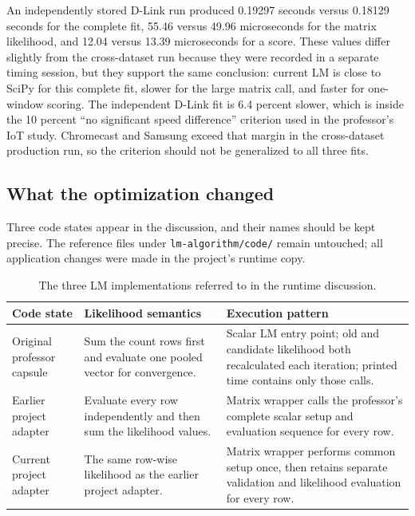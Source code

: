 \documentclass[11pt]{article}
\begin{document}
An independently stored D-Link run produced 0.19297 seconds versus 0.18129
seconds for the complete fit, 55.46 versus 49.96 microseconds for the matrix
likelihood, and 12.04 versus 13.39 microseconds for a score. These values differ
slightly from the cross-dataset run because they were recorded in a separate
timing session, but they support the same conclusion: current LM is close to
SciPy for this complete fit, slower for the large matrix call, and faster for
one-window scoring. The independent D-Link fit is 6.4 percent slower, which is
inside the 10 percent ``no significant speed difference'' criterion used in
the professor's IoT study. Chromecast and Samsung exceed that margin in the
cross-dataset production run, so the criterion should not be generalized to
all three fits.

\subsection{What the optimization changed}

Three code states appear in the discussion, and their names should be kept
precise. The reference files under \texttt{lm-algorithm/code/} remain
untouched; all application changes were made in the project's runtime copy.

\begin{table}[htbp]
\centering
\small
\caption{The three LM implementations referred to in the runtime discussion.}
\label{tab:three-lm-states}
\begin{tabular}{p{}p{}p{}}
\toprule
Code state & Likelihood semantics & Execution pattern \\
\midrule
Original professor capsule & Sum the count rows first and evaluate one pooled
vector for convergence. & Scalar LM entry point; old and candidate likelihood
both recalculated each iteration; printed time contains only those calls. \\
\addlinespace
Earlier project adapter & Evaluate every row independently and then sum the
likelihood values. & Matrix wrapper calls the professor's complete scalar setup
and evaluation sequence for every row. \\
\addlinespace
Current project adapter & The same row-wise likelihood as the earlier project
adapter. & Matrix wrapper performs common setup once, then retains separate
validation and likelihood evaluation for every row. \\
\bottomrule
\end{tabular}
\end{table}
\end{document}
